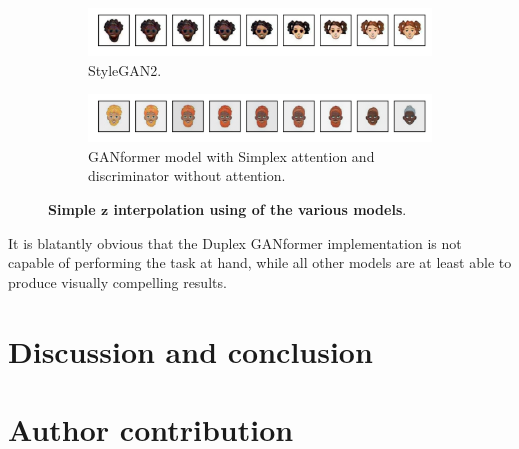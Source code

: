 \documentclass{article}
\begin{document}
	\begin{figure}[htpb]
		\centering
		\begin{subfigure}{\linewidth}
			\includegraphics[width=\linewidth]{../src/trained_network/out_imgs/interpolation_Stylegan2_300kimg.png}
			\vspace{-7mm}
			\caption{StyleGAN2.} 
		\end{subfigure}
		\begin{subfigure}{\linewidth}
			\includegraphics[width=\linewidth]{../src/trained_network/out_imgs/interpolation_GANFormer_Simplex_D_StyleGAN_300kimg.png}
			\vspace{-7mm}
			\caption{GANformer model with Simplex attention and discriminator without attention.}
		\end{subfigure}
		\vspace{3mm}
		\caption{\textbf{Simple $\mathbf{z}$ interpolation using of the various 
		models}.}\label{fig:interpolation}
	\end{figure}
    
    
	It is blatantly obvious that the Duplex GANformer implementation is not capable of performing the task at hand, while all other models are at least able to produce visually compelling results.
	
	
	\clearpage
	
	\section{Discussion and conclusion}%
	
	\section{Author contribution}
	
\end{document}
